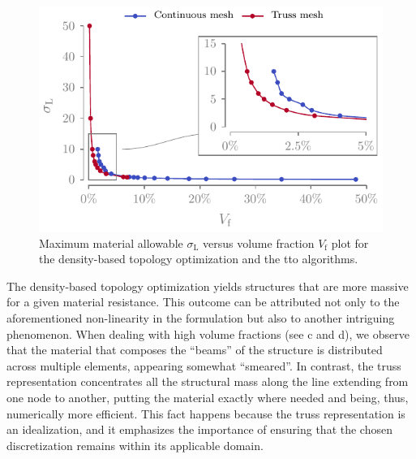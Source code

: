 \begin{figure}
    \centering
    \includegraphics{figures/03_comparison_TO_TTO/15_stress_vol/stress_vol.pdf}
    \caption{Maximum material allowable $\sigma_\text{L}$ versus volume fraction $V_\text{f}$ plot for the density-based topology optimization and the \gls{tto} algorithms.}
    \label{fig:03_stress_vol}
\end{figure}
The density-based topology optimization yields structures that are more massive for a given material resistance. This outcome can be attributed not only to the aforementioned non-linearity in the formulation but also to another intriguing phenomenon. When dealing with high volume fractions (see \eg {}c and d), we observe that the material that composes the “beams” of the structure is distributed across multiple elements, appearing somewhat “smeared”. In contrast, the truss representation concentrates all the structural mass along the line extending from one node to another, putting the material exactly where needed and being, thus, numerically more efficient. This fact happens because the truss representation is an idealization, and it emphasizes the importance of ensuring that the chosen discretization remains within its applicable domain.

